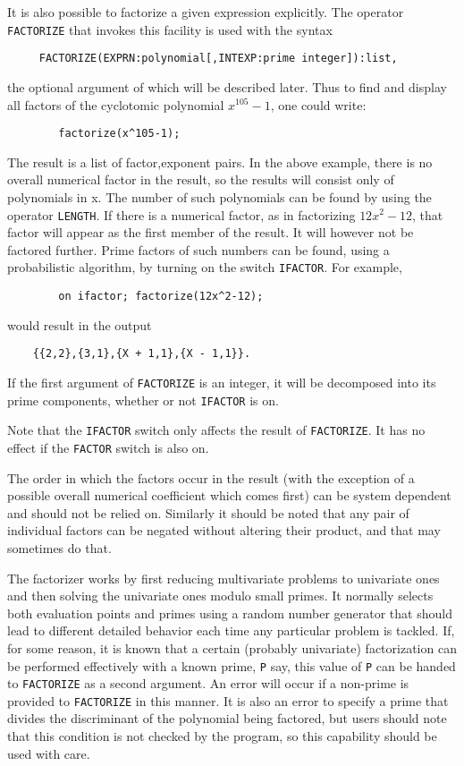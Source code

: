 It is also possible to factorize a given expression explicitly.  The
operator {\tt FACTORIZE} that invokes this facility is
used with the syntax
\begin{verbatim}
     FACTORIZE(EXPRN:polynomial[,INTEXP:prime integer]):list,
\end{verbatim}
the optional argument of which will be described later. Thus to find and
display all factors of the cyclotomic polynomial $x^{105}-1$, one could
write:
\begin{verbatim}
        factorize(x^105-1);
\end{verbatim}
The result is a list of factor,exponent pairs.
In the above example, there is no overall numerical factor in the result,
so the results will consist only of polynomials in x.  The number of such
polynomials can be found by using the operator {\tt LENGTH}.
If there is a numerical factor, as in factorizing $12x^{2}-12$,
that factor will appear as the first member of the result.
It will however not be factored further.  Prime factors of such numbers
can be found, using a probabilistic algorithm, by turning on the switch
{\tt IFACTOR}.  For example,
\begin{verbatim}
        on ifactor; factorize(12x^2-12);
\end{verbatim}
would result in the output
\begin{verbatim}
	{{2,2},{3,1},{X + 1,1},{X - 1,1}}.
\end{verbatim}

If the first argument of {\tt FACTORIZE} is an integer, it will be
decomposed into its prime components, whether or not {\tt IFACTOR} is on.

Note that the {\tt IFACTOR} switch only affects the result of {\tt FACTORIZE}.
It has no effect if the {\tt FACTOR} switch is also on.

The order in which the factors occur in the result (with the exception of
a possible overall numerical coefficient which comes first) can be system
dependent and should not be relied on. Similarly it should be noted that
any pair of individual factors can be negated without altering their
product, and that {\REDUCE} may sometimes do that.

The factorizer works by first reducing multivariate problems to univariate
ones and then solving the univariate ones modulo small primes. It normally
selects both evaluation points and primes using a random number generator
that should lead to different detailed behavior each time any particular
problem is tackled. If, for some reason, it is known that a certain
(probably univariate) factorization can be performed effectively with a
known prime, {\tt P} say, this value of {\tt P} can be handed to
{\tt FACTORIZE} as a second
argument. An error will occur if a non-prime is provided to {\tt FACTORIZE} in
this manner. It is also an error to specify a prime that divides the
discriminant of the polynomial being factored, but users should note that
this condition is not checked by the program, so this capability should be
used with care.

